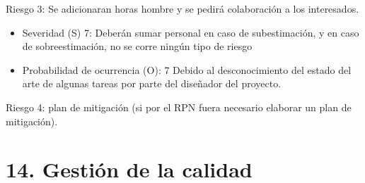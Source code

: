 \documentclass[11pt, %
codirector, %
]{charter}
\begin{document}
Riesgo 3: Se adicionaran horas hombre y se pedirá colaboración a los interesados.
\begin{itemize}
	\item Severidad (S) 7: \newline 
	Deberán sumar personal en caso de subestimación, y en caso de sobreestimación, no se corre ningún tipo de riesgo  
	\item Probabilidad de ocurrencia (O): 7  \newline
	Debido al desconocimiento del estado del arte de algunas tareas por parte del diseñador del proyecto.  
\end{itemize}
Riesgo 4: plan de mitigación (si por el RPN fuera necesario elaborar un plan de mitigación).




\section{14. Gestión de la calidad}
\label{sec:calidad}
\end{document}
